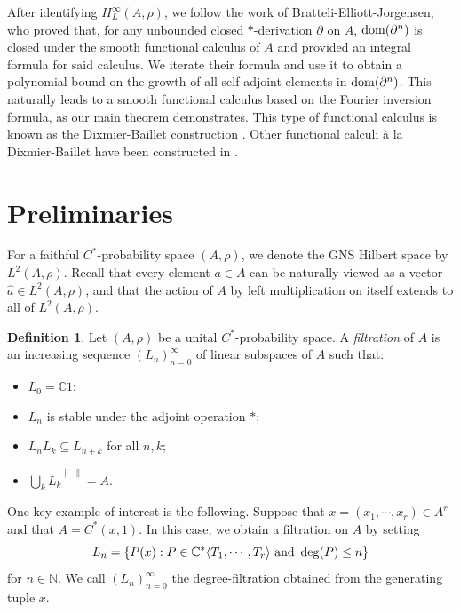 \documentclass[11pt]{article}
\theoremstyle{definition}
\newtheorem{defn}[thm]{Definition}
\theoremstyle{remark}
\numberwithin{equation}{section}
\numberwithin{equation}{section}
\def\N{\mathbb{N}}
\numberwithin{equation}{section}
\begin{document}
After identifying $H_L^{\infty}(A,\rho)$, we follow the work of Bratteli-Elliott-Jorgensen, who proved that, for any unbounded closed $*$-derivation $\partial$ on $A$, ${\rm dom}(\partial^n)$ is closed under the smooth functional calculus of $A$ and provided an integral formula for said calculus. We iterate their formula and use it to obtain a polynomial bound on the growth of all self-adjoint elements in ${\rm dom}(\partial^n)$. This naturally leads to a smooth functional calculus based on the Fourier inversion formula, as our main theorem demonstrates. This type of functional calculus is known as the Dixmier-Baillet construction \cite{Di60,MB79}. Other functional calculi \`a la Dixmier-Baillet have been constructed in \cite{KiSh94,Fl25a,Fl25b}.




\section{Preliminaries}

For a faithful $C^{*}$-probability space $(A,\rho)$, we denote the GNS Hilbert space by $L^2(A,\rho)$. Recall that every element $a\in A$ can be naturally viewed as a vector $\hat a\in L^2(A,\rho)$, and that the action of $A$ by left multiplication on itself extends to all of $L^2(A,\rho)$. 

\begin{defn}\label{defn:RDP}
Let $(A,\rho)$ be a unital $C^{*}$-probability space. A \emph{filtration} of $A$ is an increasing sequence $(L_{n})_{n=0}^{\infty}$ of linear subspaces of $A$ such that:
\begin{itemize}
    \item $L_{0}=\mathbb C 1$;
    \item $L_{n}$ is stable under the adjoint operation $*$;
    \item $L_{n}L_{k}\subseteq L_{n+k}$ for all $n,k$;
    \item $\overline{\bigcup_{k}L_{k}}^{\|\cdot\|}=A$.
\end{itemize}
\end{defn}



One key example of interest is the following. Suppose that $x=(x_{1},\cdots,x_{r})\in A^{r}$ and that $A=C^{*}(x,1)$. In this case, we obtain a filtration on $A$ by setting 
\[
L_{n}=\{P(x):P\in \mathbb C^{*}\langle{T_{1},\cdots,T_{r}}\rangle \textnormal{ and } \deg(P)\leq n\}
\]
for $n\in \N$. We call $(L_{n})_{n=0}^{\infty}$ the degree-filtration obtained from the generating tuple $x$. 
\end{document}
